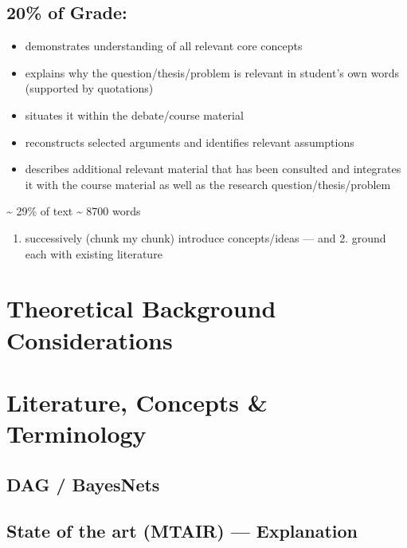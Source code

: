 \documentclass[
  letterpaper,
]{book}
\providecommand{\tightlist}{%
  \setlength{\itemsep}{0pt}\setlength{\parskip}{0pt}}
\begin{document}
\subsection{20\% of Grade:}\label{of-grade}

\begin{itemize}
\item
  demonstrates understanding of all relevant core concepts
\item
  explains why the question/thesis/problem is relevant in student's own
  words (supported by quotations)
\item
  situates it within the debate/course material
\item
  reconstructs selected arguments and identifies relevant assumptions
\item
  describes additional relevant material that has been consulted and
  integrates it with the course material as well as the research
  question/thesis/problem
\end{itemize}

\textasciitilde{} 29\% of text \textasciitilde{} 8700 words

\begin{enumerate}
\def\labelenumi{\arabic{enumi}.}
\tightlist
\item
  successively (chunk my chunk) introduce concepts/ideas --- and 2.
  ground each with existing literature
\end{enumerate}

\section{Theoretical Background
Considerations}\label{theoretical-background-considerations}

\section{Literature, Concepts \&
Terminology}\label{literature-concepts-terminology}

\subsection{DAG / BayesNets}\label{dag-bayesnets}

\subsection{State of the art (MTAIR) ---
Explanation}\label{state-of-the-art-mtair-explanation}
\end{document}
